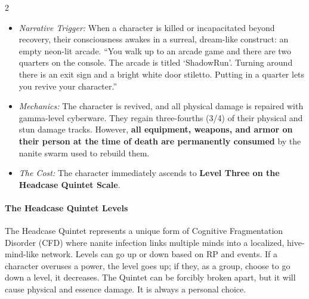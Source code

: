 \documentclass[
  oneside]{article}
\providecommand{\tightlist}{%
  \setlength{\itemsep}{0pt}\setlength{\parskip}{0pt}}
\begin{document}
\begin{multicols}{2}
\begin{itemize}
  \begin{itemize}
  \tightlist
  \item
    \emph{Narrative Trigger:} When a character is
    killed or incapacitated beyond recovery, their
    consciousness awakes in a surreal, dream-like
    construct: an empty neon-lit arcade. ``You
    walk up to an arcade game and there are two
    quarters on the console. The arcade is titled
    `ShadowRun'. Turning around there is an exit
    sign and a bright white door stiletto. Putting
    in a quarter lets you revive your character.''
  \item
    \emph{Mechanics:} The character is revived,
    and all physical damage is repaired with
    gamma-level cyberware. They regain
    three-fourths (3/4) of their physical and stun
    damage tracks. However, \textbf{all equipment,
    weapons, and armor on their person at the time
    of death are permanently consumed} by the
    nanite swarm used to rebuild them.
  \item
    \emph{The Cost:} The character immediately
    ascends to \textbf{Level Three on the Headcase
    Quintet Scale}.
  \end{itemize}
\end{itemize}

\hypertarget{the-headcase-quintet-levels}{%
\paragraph{The Headcase Quintet
Levels}\label{the-headcase-quintet-levels}}

The Headcase Quintet represents a unique form of
Cognitive Fragmentation Disorder (CFD) where
nanite infection links multiple minds into a
localized, hive-mind-like network. Levels can go
up or down based on RP and events. If a character
overuses a power, the level goes up; if they, as a
group, choose to go down a level, it decreases.
The Quintet can be forcibly broken apart, but it
will cause physical and essence damage. It is
always a personal choice.


\end{multicols}
\end{document}
